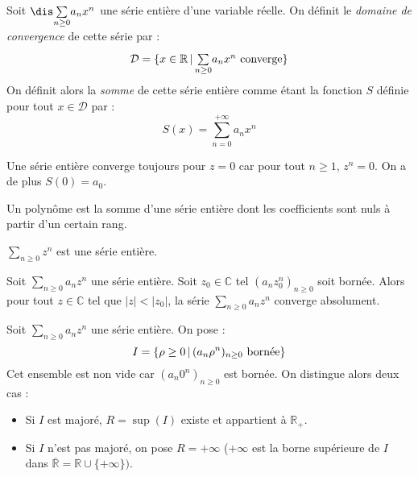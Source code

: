 \documentclass[a4paper,10pt]{report}
\newcommand{\Sum}[2]{\ensuremath{\textstyle{\sum\limits_{#1}^{#2}}}}
\begin{document}
  \begin{defin} Soit $\dis \Sum{n \geq 0}{} a_n x^n$ une série entière d'une variable réelle. On définit le \textit{domaine de convergence} de cette série par :
 $$ \mathcal{D} = \lbrace x \in \mathbb{R} \, \vert \,  \Sum{n \geq 0}{} a_n x^n \hbox{ converge} \rbrace$$
 On définit alors la \textit{somme} de cette série entière comme étant la fonction $S$ définie pour tout $x \in \mathcal{D}$ par :
 $$ S(x) = \sum_{n=0}^{+ \infty} a_n x^n$$
 \end{defin}
 
 \begin{rems} 
 \item Une série entière converge toujours pour $z=0$ car pour tout $n \geq 1$, $z^n=0$. On a de plus $S(0)=a_0$.
 \item Un polynôme est la somme d'une série entière dont les coefficients sont nuls à partir d'un certain rang.
 \end{rems}

\begin{ex} $\Sum{n \geq 0}{} z^n$ est une série entière. 

\end{ex}

\newpage

\begin{lem}[Abel]
Soit $\Sum{n \geq 0}{} a_n z^n$ une série entière. Soit $z_0 \in \mathbb{C}$ tel $(a_n z_0^n)_{n \geq 0}$ soit bornée. Alors pour tout $z \in \mathbb{C}$ tel que $\vert z \vert < \vert z_0 \vert$, la série $\Sum{n \geq 0}{} a_n z^n$ converge absolument.
\end{lem}

\begin{preuve}

\vspace{6cm}
\end{preuve}

\noindent Soit $\Sum{n \geq 0}{} a_n z^n$ une série entière. On pose :
$$ I = \lbrace \rho \geq 0 \, \vert \, (a_n \rho^n)_{n \geq 0} \hbox{ bornée}\rbrace $$
Cet ensemble est non vide car $(a_n 0^n)_{n \geq 0}$ est bornée. On distingue alors deux cas :
\begin{itemize}
\item Si $I$ est majoré, $R = \sup(I)$ existe et appartient à $\mathbb{R}_+$.
\item Si $I$ n'est pas majoré, on pose $R= + \infty$ ($+ \infty$ est la borne supérieure de $I$ dans $\overline{\mathbb{R}} = \mathbb{R} \cup \lbrace + \infty \rbrace)$.
\end{itemize}
\end{document}
